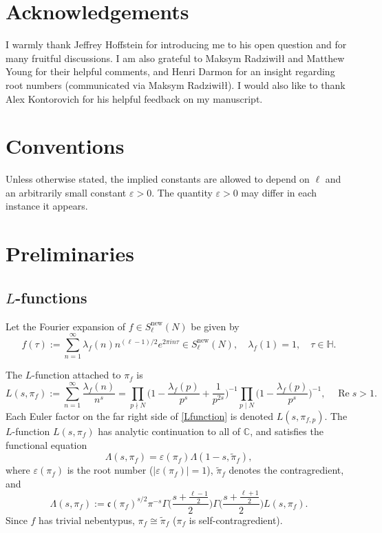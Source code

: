 \documentclass[12pt,reqno]{amsart}
\theoremstyle{plain}
\theoremstyle{remark}
\renewcommand{\Re}{\operatorname{Re}}
\numberwithin{equation}{section}
\numberwithin{lemma}{section}
\numberwithin{theorem}{section}
\numberwithin{prop}{section}
\numberwithin{remark}{section}
\begin{document}
\section*{Acknowledgements}
I warmly thank Jeffrey Hoffstein for introducing me to his open question 
and for many fruitful discussions. I am also grateful to Maksym Radziwi\l{}\l{} and Matthew Young
for their helpful comments, and Henri Darmon for an insight regarding root numbers
(communicated via Maksym Radziwi\l{}\l{}).  I would also like to thank Alex Kontorovich 
for his helpful feedback on my manuscript.

\section*{Conventions}
Unless otherwise stated, the implied constants are allowed to depend on $\ell$
and an arbitrarily small constant $\varepsilon>0$. The quantity $\varepsilon>0$
may differ in each instance it appears.

\section{Preliminaries} \label{preliminaries}
\subsection{$L$-functions}
Let the Fourier expansion of $f \in S_{\ell}^{\text{new}}(N)$
be given by 
\begin{equation} \label{fourier}
f(\tau):=\sum_{n=1}^{\infty} \lambda_f(n) n^{(\ell-1)/2} e^{2 \pi i n \tau}  
\in S^{\text{new}}_{\ell}(N), \quad \lambda_f(1)=1, \quad \tau \in \mathbb{H}.
\end{equation}

The $L$-function attached to $\pi_f$ is 
\begin{equation} \label{Lfunction}
L(s,\pi_f):=\sum_{n=1}^{\infty} \frac{\lambda_f(n)}{n^s}=\prod_{p \nmid N} 
\Big(1-\frac{\lambda_f(p)}{p^{s}}+\frac{1}{p^{2s}} \Big)^{-1}  \prod_{p \mid N}
\Big(1-\frac{\lambda_f(p)}{p^{s}} \Big)^{-1}, \quad \Re s>1.
\end{equation}
Each Euler factor on the far right side of \eqref{Lfunction} is denoted $L(s,\pi_{f,p})$.
The $L$-function $L(s,\pi_{f})$ has analytic continuation to all 
of $\mathbb{C}$, and satisfies the functional equation 
\cite[Theorem~14.17]{IK}
\begin{equation*}
\Lambda(s,\pi_{f})=\varepsilon(\pi_f) \Lambda(1-s,\widetilde{\pi}_{f}),
\end{equation*}
where $\varepsilon(\pi_f)$ is the root number ($|\varepsilon(\pi_f)|=1$), $\widetilde{\pi}_{f}$ denotes the 
contragredient, and 
\begin{equation*}
\Lambda(s,\pi_f):=\mathfrak{c}(\pi_f)^{s/2} \pi^{-s} \Gamma \Big( \frac{s+\frac{\ell-1}{2}}{2} \Big) 
\Gamma \Big( \frac{s+\frac{\ell+1}{2}}{2} \Big) L(s,\pi_f).
\end{equation*}
Since $f$ has trivial nebentypus, $\pi_f \cong \widetilde{\pi}_f$ ($\pi_f$ is self-contragredient).
\end{document}
